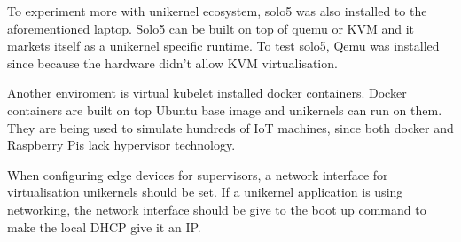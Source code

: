To experiment more with unikernel ecosystem, solo5 was also installed to the aforementioned laptop. Solo5 can be built on top of quemu or KVM and it markets itself as a unikernel specific runtime. To test solo5, Qemu was installed since because the hardware didn't allow KVM virtualisation.

Another enviroment is virtual kubelet installed docker containers. Docker containers are built on top Ubuntu base image and unikernels can run on them. They are being used to simulate hundreds of IoT machines, since both docker and Raspberry Pis lack hypervisor technology.

When configuring edge devices for supervisors, a network interface for virtualisation unikernels should be set. If a unikernel application is using networking, the network interface should be give to the boot up command to make the local DHCP give it an IP.

